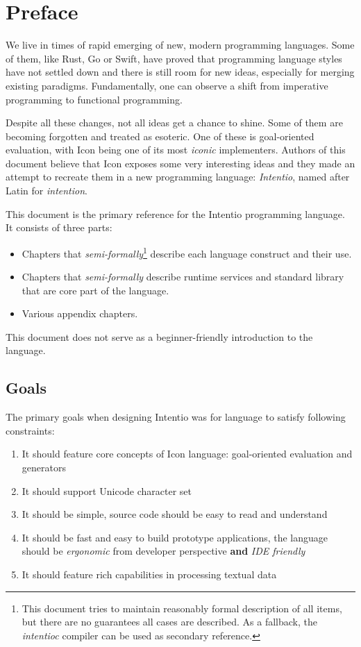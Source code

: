 \chapter{Preface}

We live in times of rapid emerging of new, modern programming languages. Some of them, like Rust\cite{TheRustProgrammingLanguage}, Go\cite{TheGoProgrammingLanguage} or Swift\cite{TheSwiftProgrammingLanguage}, have proved that programming language styles have not settled down and there is still room for new ideas, especially for merging existing paradigms. Fundamentally, one can observe a shift from imperative programming to functional programming.

Despite all these changes, not all ideas get a chance to shine. Some of them are becoming forgotten and treated as esoteric. One of these is goal-oriented evaluation, with Icon\cite{TheIconProgrammingLanguage} being one of its most \emph{iconic} implementers. Authors of this document believe that Icon exposes some very interesting ideas and they made an attempt to recreate them in a new programming language: \emph{Intentio}, named after Latin for \emph{intention}.

This document is the primary reference for the Intentio programming language. It consists of three parts:
\begin{itemize}
  \item Chapters that \emph{semi-formally}\footnote{This document tries to maintain reasonably formal description of all items, but there are no guarantees all cases are described. As a fallback, the \emph{intentioc}\cite{intentioc} compiler can be used as secondary reference.} describe each language construct and their use.
  \item Chapters that \emph{semi-formally} describe runtime services and standard library that are core part of the language.
  \item Various appendix chapters.
\end{itemize}

This document does not serve as a beginner-friendly introduction to the language.

\section*{Goals}

The primary goals when designing Intentio was for language to satisfy following constraints:
\begin{enumerate}
  \item It should feature core concepts of Icon language: goal-oriented evaluation and generators
  \item It should support Unicode character set
  \item It should be simple, source code should be easy to read and understand
  \item It should be fast and easy to build prototype applications, the language should be \emph{ergonomic} from developer perspective \textbf{and} \emph{IDE friendly}
  \item It should feature rich capabilities in processing textual data
\end{enumerate}

